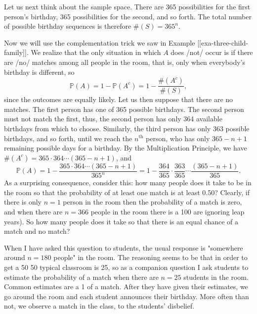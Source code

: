 Let us next think about the sample space. There are 365 possibilities
for the first person's birthday, 365 possibilities for the second, and
so forth. The total number of possible birthday sequences is therefore
\(\#(S)=365^{n}\).

Now we will use the complementation trick we saw in Example [[exa-three-child-family]]. We realize that the only situation in which \(A\) does
/not/ occur is if there are /no/ matches among all people in the room,
that is, only when everybody's birthday is different, so \[
\mathbb{P}(A)=1-\mathbb{P}(A^{c})=1-\frac{\#(A^{c})}{\#(S)}, \] since
the outcomes are equally likely. Let us then suppose that there are no
matches. The first person has one of 365 possible birthdays. The
second person must not match the first, thus, the second person has
only 364 available birthdays from which to choose. Similarly, the
third person has only 363 possible birthdays, and so forth, until we
reach the \(n^{\mathrm{th}}\) person, who has only \(365-n+1\)
remaining possible days for a birthday. By the Multiplication
Principle, we have \(\#(A^{c})=365\cdot364\cdots(365-n+1)\), and
\begin{equation}
\mathbb{P}(A)=1-\frac{365\cdot364\cdots(365-n+1)}{365^{n}}=1-\frac{364}{365}\cdot\frac{363}{365}\cdots\frac{(365-n+1)}{365}.
\end{equation}
As a surprising consequence, consider this: how many people does it
take to be in the room so that the probability of at least one match
is at least 0.50? Clearly, if there is only \(n=1\) person in the room
then the probability of a match is zero, and when there are \(n=366\)
people in the room there is a 100%
are ignoring leap years). So how many people does it take so that
there is an equal chance of a match and no match?

When I have asked this question to students, the usual response is
"somewhere around \(n=180\) people" in the room. The reasoning seems
to be that in order to get a 50%
50%
typical classroom is 25, so as a companion question I ask students to
estimate the probability of a match when there are \(n=25\) students
in the room. Common estimates are a 1%
of a match. After they have given their estimates, we go around the
room and each student announces their birthday. More often than not,
we observe a match in the class, to the students' disbelief.

